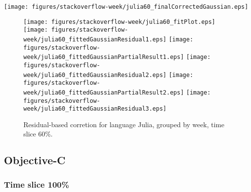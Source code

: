 \begin{center}
{\texttt{[image: figures/stackoverflow-week/julia60\_finalCorrectedGaussian.eps]}}
\end{center}

\FloatBarrier

\begin{figure}[t]
\centering
{}
{\texttt{[image: figures/stackoverflow-week/julia60\_fitPlot.eps]}}
{\texttt{[image: figures/stackoverflow-week/julia60\_fittedGaussianResidual1.eps]}}
{\texttt{[image: figures/stackoverflow-week/julia60\_fittedGaussianPartialResult1.eps]}}
{\texttt{[image: figures/stackoverflow-week/julia60\_fittedGaussianResidual2.eps]}}
{\texttt{[image: figures/stackoverflow-week/julia60\_fittedGaussianPartialResult2.eps]}}
{\texttt{[image: figures/stackoverflow-week/julia60\_fittedGaussianResidual3.eps]}}
\caption{Residual-based corretion for language Julia, grouped by week, time slice 60\%.}
\end{figure}


\FloatBarrier


\subsection{Objective-C}

\subsubsection{Time slice 100\%}

